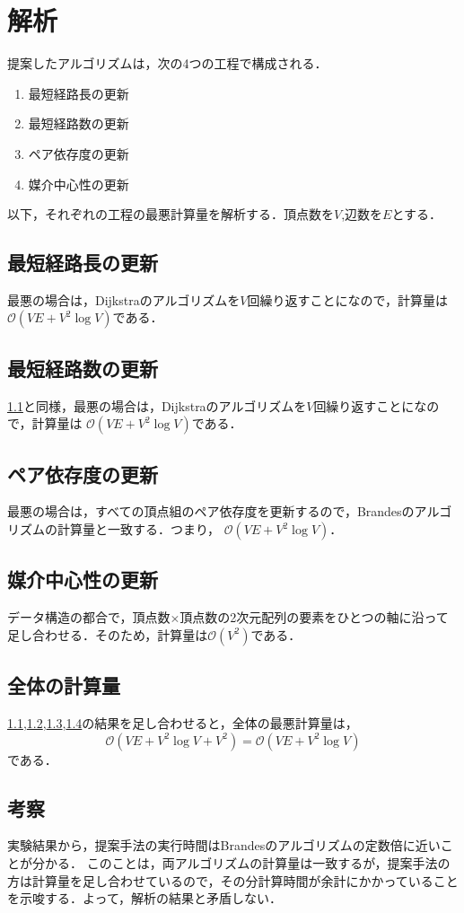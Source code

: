 \section{解析}

提案したアルゴリズムは，次の4つの工程で構成される．

\begin{enumerate}
\item 最短経路長の更新
\item 最短経路数の更新
\item ペア依存度の更新
\item 媒介中心性の更新
\end{enumerate}

以下，それぞれの工程の最悪計算量を解析する．頂点数を$V$,辺数を$E$とする．

\subsection{最短経路長の更新}
\label{subsect:phase1}
最悪の場合は，Dijkstraのアルゴリズムを$V$回繰り返すことになので，計算量は
$\mathcal{O}(VE+V^2\log V)$である．

\subsection{最短経路数の更新}
\label{subsect:phase2}
\ref{subsect:phase1}と同様，最悪の場合は，Dijkstraのアルゴリズムを$V$回繰り返すことになので，計算量は
$\mathcal{O}(VE+V^2\log V)$である．

\subsection{ペア依存度の更新}
\label{subsect:phase3}
最悪の場合は，すべての頂点組のペア依存度を更新するので，Brandesのアルゴリズムの計算量と一致する．つまり，
$\mathcal{O}(VE+V^2\log V)$．

\subsection{媒介中心性の更新}
\label{subsect:phase4}
データ構造の都合で，頂点数$\times$頂点数の2次元配列の要素をひとつの軸に沿って足し合わせる．そのため，計算量は$\mathcal{O}(V^2)$である．

\subsection{全体の計算量}
\ref{subsect:phase1},\ref{subsect:phase2},\ref{subsect:phase3},\ref{subsect:phase4}の結果を足し合わせると，全体の最悪計算量は，
\[ \mathcal{O}(VE+V^2\log V+V^2)=\mathcal{O}(VE+V^2\log V) \]
である．

\subsection{考察}
実験結果から，提案手法の実行時間はBrandesのアルゴリズムの定数倍に近いことが分かる．
このことは，両アルゴリズムの計算量は一致するが，提案手法の方は計算量を足し合わせているので，その分計算時間が余計にかかっていることを示唆する．よって，解析の結果と矛盾しない．

